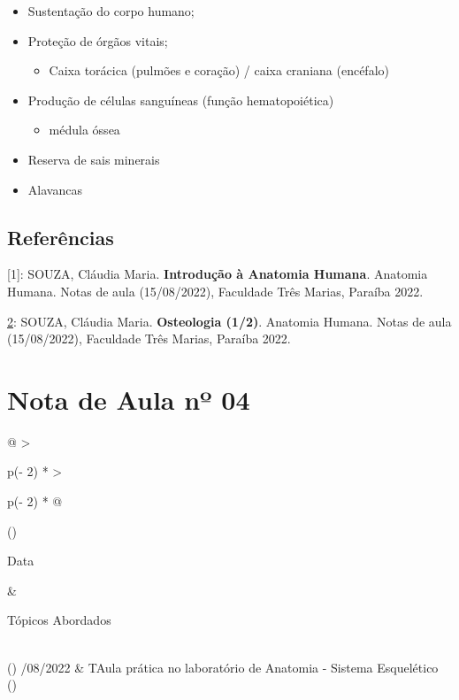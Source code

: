 \documentclass[
]{book}
\providecommand{\tightlist}{%
  \setlength{\itemsep}{0pt}\setlength{\parskip}{0pt}}
\begin{document}
\begin{itemize}
\tightlist
\item
  Sustentação do corpo humano;
\item
  Proteção de órgãos vitais;

  \begin{itemize}
  \tightlist
  \item
    Caixa torácica (pulmões e coração) / caixa craniana (encéfalo)
  \end{itemize}
\item
  Produção de células sanguíneas (função hematopoiética)

  \begin{itemize}
  \tightlist
  \item
    médula óssea
  \end{itemize}
\item
  Reserva de sais minerais
\item
  Alavancas
\end{itemize}

\hypertarget{referuxeancias-1}{%
\subsection{Referências}\label{referuxeancias-1}}

{[}1{]}: SOUZA, Cláudia Maria. \textbf{Introdução à Anatomia Humana}. Anatomia Humana. Notas de aula (15/08/2022), Faculdade Três Marias, Paraíba 2022.

\href{MARIEB,\%20Elaine\%20N.;\%20WILHELM,\%20Patricia\%20Brady;\%20MALLAT,\%20Jon.\%20**Anatomia\%20Humana**.\%207.ed.\%20São\%20Paulo:Pearson,\%202014.}{2}: SOUZA, Cláudia Maria. \textbf{Osteologia (1/2)}. Anatomia Humana. Notas de aula (15/08/2022), Faculdade Três Marias, Paraíba 2022.

\hypertarget{nota-de-aula-nuxba-04}{%
\section{Nota de Aula nº 04}\label{nota-de-aula-nuxba-04}}

\begin{longtable}[]{@{}
  >{\raggedright\arraybackslash}p{(\columnwidth - 2\tabcolsep) * }
  >{\raggedright\arraybackslash}p{(\columnwidth - 2\tabcolsep) * }@{}}
\toprule()
\begin{minipage}[b]{\linewidth}\raggedright
Data
\end{minipage} & \begin{minipage}[b]{\linewidth}\raggedright
Tópicos Abordados
\end{minipage} \\
\midrule()
/08/2022 & TAula prática no laboratório de Anatomia - Sistema Esquelético \\
\bottomrule()
\end{longtable}
\end{document}
